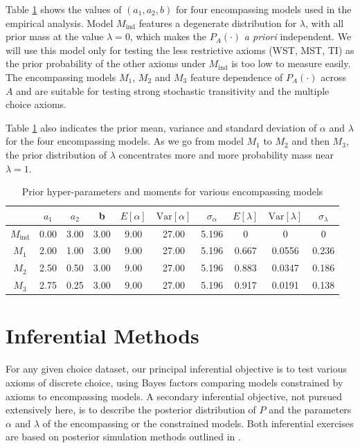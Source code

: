 \documentclass[11pt,letter]{article}
\begin{document}
Table \ref{t:hyper} shows the values of $(a_1, a_2, b)$ for four encompassing models used in the empirical analysis.
Model $M_{\mathrm{ind}}$ features a degenerate distribution for $\lambda$, with all prior mass at the value $\lambda = 0$, which makes the $P_A(\cdot)$ {\em a priori} independent.
We will use this model only for testing the less restrictive axioms (WST, MST, TI) as the prior probability of the other axioms under $M_{\mathrm{ind}}$ is too low to measure easily.
The encompassing models $M_1$, $M_2$ and $M_3$ feature dependence of $P_A(\cdot)$ across $A$ and are suitable for testing strong stochastic transitivity and the multiple choice axioms.

Table \ref{t:hyper} also indicates the prior mean, variance and standard deviation of $\alpha$ and $\lambda$ for the four encompassing models.
As we go from model $M_1$ to $M_2$ and then $M_3$, the prior distribution of $\lambda$ concentrates more and more probability mass near $\lambda = 1$.

\begin{table}
\begin{center}
\begin{tabular}{cccccccccc}
 & $a_1$ & $a_2$ & b &
 $E[\alpha]$ & $\mathrm{Var}[\alpha]$ & $\sigma_\alpha$ & $E[\lambda]$ & $\mathrm{Var}[\lambda]$ & $\sigma_\lambda$ \\
 \hline
 $M_{\mathrm{ind}}$ & 0.00 & 3.00 & 3.00 & 9.00 & 27.00 & 5.196 & 0 & 0 & 0 \\
 \hline
 $M_1$ & 2.00 & 1.00 & 3.00 & 9.00 & 27.00 & 5.196 & 0.667 & 0.0556 & 0.236 \\
 $M_2$ & 2.50 & 0.50 & 3.00 & 9.00 & 27.00 & 5.196 & 0.883 & 0.0347 & 0.186 \\
 $M_3$ & 2.75 & 0.25 & 3.00 & 9.00 & 27.00 & 5.196 & 0.917 & 0.0191 & 0.138 \\
 \hline
\end{tabular}
\end{center}\caption{Prior hyper-parameters and moments for various encompassing models}\label{t:hyper}
\end{table}

\section{Inferential Methods}\label{s:inference}

For any given choice dataset, our principal inferential objective is to test various axioms of discrete choice, using Bayes factors comparing models constrained by axioms to encompassing models.
A secondary inferential objective, not pursued extensively here, is to describe the posterior distribution of $P$ and the parameters $\alpha$ and $\lambda$ of the encompassing or the constrained models.
Both inferential exercises are based on posterior simulation methods outlined in .
\end{document}
